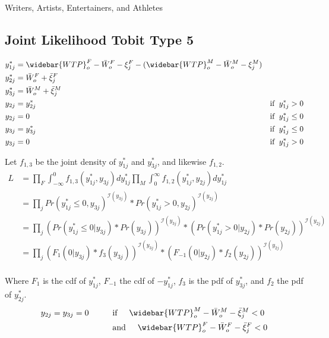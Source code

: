 \documentclass[11pt]{article}
\begin{document}
   Writers, Artists, Entertainers, and Athletes
   
   
 \subsection{Joint Likelihood Tobit Type 5}


\begin{align*}
y_{1j}^* &= \widebar{WTP}^F_o - \bar{W}^F_o  - \xi^F_j - (\widebar{WTP}^M_o - \bar{W}^M_o  - \xi^M_j) \\
y_{2j}^* &= \bar{W}^F_o + \bar{\xi}^F_j \\
y_{3j}^* &= \bar{W}^M_o + \bar{\xi}^M_j \\
y_{2j} &= y_{2j}^* \hspace{10mm} &\text{if} \hspace{2mm} y_{1j}^* >0 \\
y_{2j} &= 0 \hspace{10mm} &\text{if} \hspace{2mm} y_{1j}^* \leq 0 \\
y_{3j} &= y_{3j}^* \hspace{10mm} &\text{if} \hspace{2mm} y_{1j}^* \leq 0 \\
y_{3j} &= 0 \hspace{10mm} &\text{if} \hspace{2mm} y_{1j}^* > 0 \\
\end{align*}


Let $f_{1,3}$ be the joint density of $y_{1j}^*$ and $y_{3j}^*$, and likewise $f_{1,2}$.
\begin{align*}
L &= \prod_F \int_{-\infty}^0 f_{1,3}(y_{1j}^*,y_{3j}) dy_{1j}^* \prod_M \int_{0}^{\infty} f_{1,2}(y_{1j}^*,y_{2j}) dy_{1j}^* \\
&= \prod_j Pr(y_{1j}^* \leq 0, y_{3j})^{\mathcal{I}(y_{3j})}*Pr(y_{1j}^* > 0, y_{2j})^{\mathcal{I}(y_{2j})} \\
&= \prod_j (Pr(y_{1j}^* \leq 0 | y_{3j})*Pr(y_{3j}))^{\mathcal{I}(y_{3j})}*(Pr(y_{1j}^* > 0| y_{2j})*Pr(y_{2j}))^{\mathcal{I}(y_{2j})}\\
&= \prod_j (F_{1}(0|y_{3j})*f_3(y_{3j}))^{\mathcal{I}(y_{3j})}*(F_{-1}( 0| y_{2j})*f_2(y_{2j}))^{\mathcal{I}(y_{2j})}\\
\end{align*}

Where $F_1$ is the cdf of $y_{1j}^*$, $F_{-1}$ the cdf of $-y_{1j}^*$, $f_3$ is the pdf of $y_{3j}^*$, and $f_2$ the pdf of $y_{2j}^*$.
\begin{align*}
 y_{2j}=y_{3j}=0 \hspace{10mm} &\text{if} \hspace{5mm} \widebar{WTP}^M_o - \bar{W}^M_o - \bar{\xi}^M_j < 0\\
 &\text{and} \hspace{5mm} \widebar{WTP}^F_o - \bar{W}^F_o -  \bar{\xi}^F_j < 0 \\
\end{align*}
\end{document}
